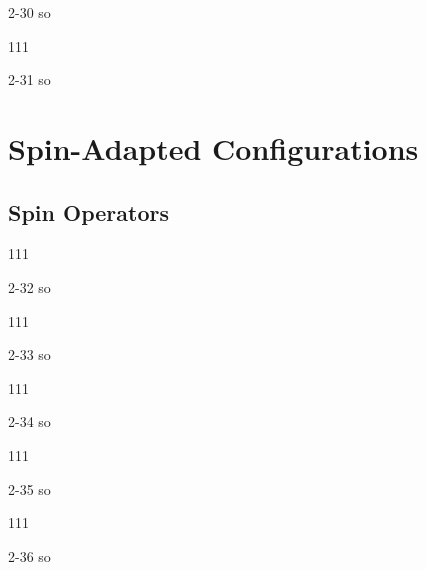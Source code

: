 \documentclass[a4paper]{book}
\begin{document}
	\begin{solution}
		2-30 so
	\end{solution}
	
	\begin{exercise}
	111
	\end{exercise}
	
	\begin{solution}
		2-31 so
	\end{solution}
	
	\section{Spin-Adapted Configurations}
	
	\subsection{Spin Operators}
	
	\begin{exercise}
	111
	\end{exercise}
	
	\begin{solution}
		2-32 so
	\end{solution}
	
	\begin{exercise}
	111
	\end{exercise}
	
	\begin{solution}
		2-33 so
	\end{solution}
	
	\begin{exercise}
	111
	\end{exercise}
	
	\begin{solution}
		2-34 so
	\end{solution}
	
	\begin{exercise}
	111
	\end{exercise}
	
	\begin{solution}
		2-35 so
	\end{solution}
	
	\begin{exercise}
	111
	\end{exercise}
	
	\begin{solution}
		2-36 so
	\end{solution}
	
\end{document}
